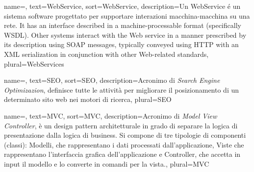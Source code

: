 {
	name=,
	text=WebService,
	sort=WebService,
	description={Un WebService é un sistema software progettato per supportare interazioni macchina-macchina su una rete. It has an interface described in a machine-processable format (specifically WSDL). Other systems interact with the Web service in a manner prescribed by its description using SOAP messages, typically conveyed using HTTP with an XML serialization in conjunction with other Web-related standards},
	plural=WebServices
}


{
	name=,
	text=SEO,
	sort=SEO,
	description={Acronimo di \textit{Search Engine Optimizazion}, definisce tutte le attività per migliorare il posizionamento di un determinato sito web nei motori di ricerca},
	plural=SEO
}


{
	name=,
	text=MVC,
	sort=MVC,
	description={Acronimo di \textit{Model View Controller}, è un design pattern architetturale in grado di separare la logica di presentazione dalla logica di business. Si compone di tre tipologie di componenti (classi): Modelli, che rappresentano i dati processati dall'applicazione, Viste che rappresentano l'interfaccia grafica dell'applicazione e Controller, che accetta in input il modello e lo converte in comandi per la vista.},
	plural=MVC
}